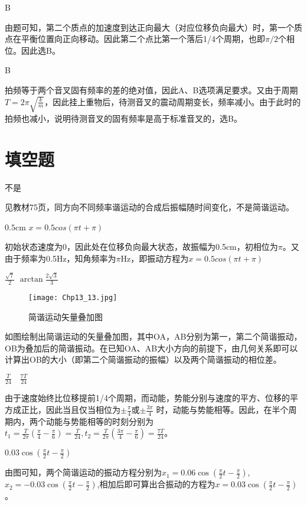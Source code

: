 \exercise B

\solve 
由题可知，第二个质点的加速度到达正向最大（对应位移负向最大）时，第一个质点在平衡位置向正向移动。因此第二个点比第一个落后1/4个周期，也即$\pi/2$个相位。因此选B。

\exercise B

\solve
拍频等于两个音叉固有频率的差的绝对值，因此A、B选项满足要求。又由于周期$T=2\pi\sqrt{\frac{k}{m}}$，因此挂上重物后，待测音叉的震动周期变长，频率减小。由于此时的拍频也减小，说明待测音叉的固有频率是高于标准音叉的，选B。

\section{填空题}
\exercise 不是

\solve 
见教材75页，同方向不同频率谐运动的合成后振幅随时间变化，不是简谐运动。

\exercise $0.5\mathrm{cm}$ \quad $x=0.5cos(\pi t+\pi)$

\solve
初始状态速度为0，因此处在位移负向最大状态，故振幅为0.5cm，初相位为$\pi$。又由于频率为0.5Hz，知角频率为$\pi$Hz，即振动方程为$x=0.5cos(\pi t+\pi)$
 
\exercise $\frac{\sqrt{7}}{2}$ \quad $\arctan{\frac{2\sqrt{3}}{3}}$

\solve
\begin{figure}[htbp]
\centering
\texttt{[image: Chp13\_13.jpg]}
\caption{简谐运动矢量叠加图}
\end{figure}
如图绘制出简谐运动的矢量叠加图，其中OA，AB分别为第一，第二个简谐振动，OB为叠加后的简谐振动。在已知OA、AB大小方向的前提下，由几何关系即可以计算出OB的大小（即第二个简谐振动的振幅）以及两个简谐振动的相位差。

\exercise $\frac{T}{24} \quad \frac{7T}{24}$

\solve
由于速度始终比位移提前1/4个周期，而动能，势能分别与速度的平方、位移的平方成正比，因此当且仅当相位为$\pm\frac{\pi}{4}$或$\pm\frac{3\pi}{4}$ 时，动能与势能相等。因此，在半个周期内，两个动能与势能相等的时刻分别为$t_1=\frac{T}{2\pi}\left(\frac{\pi}{4}-\frac{\pi}{6}\right)=\frac{T}{24}, t_2=\frac{T}{2\pi}\left(\frac{3\pi}{4}-\frac{\pi}{6}\right)=\frac{7T}{24}$。

\exercise $0.03\cos(\frac{\pi}{2}t-\frac{\pi}{2})$

\solve
由图可知，两个简谐运动的振动方程分别为$x_1=0.06\cos(\frac{\pi}{2}t-\frac{\pi}{2})$,$x_2=-0.03\cos(\frac{\pi}{2}t-\frac{\pi}{2})$,相加后即可算出合振动的方程为$x=0.03\cos(\frac{\pi}{2}t-\frac{\pi}{2})$。

